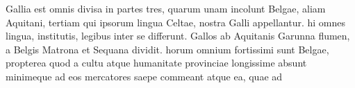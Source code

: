   Gallia est omnis divisa in partes tres, quarum unam
incolunt Belgae, aliam Aquitani, tertiam qui ipsorum lingua Celtae,
nostra Galli appellantur.  hi omnes lingua, institutis, legibus
inter se differunt. Gallos ab Aquitanis Garunna flumen, a Belgis
Matrona et Sequana dividit.  horum omnium fortissimi sunt
Belgae, propterea quod a cultu atque humanitate provinciae longissime
absunt minimeque ad eos mercatores saepe commeant atque ea, quae ad
